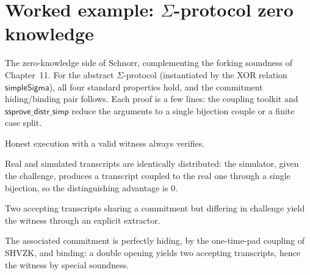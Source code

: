 \chapter{Worked example: $\Sigma$-protocol zero knowledge}

The zero-knowledge side of Schnorr, complementing the forking soundness of
Chapter~11. For the abstract $\Sigma$-protocol (instantiated by the XOR relation
$\mathsf{simpleSigma}$), all four standard properties hold, and the commitment
hiding/binding pair follows. Each proof is a few lines: the coupling toolkit and
$\mathsf{ssprove\_distr\_simp}$ reduce the arguments to a single bijection couple
or a finite case split.

\begin{theorem}[Completeness]
  \label{thm:sigma-complete}
  \leanok
  Honest execution with a valid witness always verifies.
\end{theorem}

\begin{theorem}
  \label{thm:sigma-shvzk}
  \leanok
  Real and simulated transcripts are identically distributed: the simulator, given
  the challenge, produces a transcript coupled to the real one through a single
  bijection, so the distinguishing advantage is $0$.
\end{theorem}

\begin{theorem}
  \label{thm:sigma-sound}
  \leanok
  Two accepting transcripts sharing a commitment but differing in challenge yield
  the witness through an explicit extractor.
\end{theorem}

\begin{theorem}
  \label{thm:sigma-commitment}
  \leanok
  The associated commitment is perfectly hiding, by the one-time-pad coupling of
  SHVZK, and binding: a double opening yields two accepting transcripts, hence the
  witness by special soundness.
\end{theorem}

